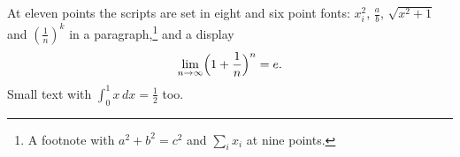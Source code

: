\documentclass[11pt]{article}
\begin{document}
At eleven points the scripts are set in eight and six point fonts: $x_i^2$, $\frac{a}{b}$, $\sqrt{x^2+1}$ and $\left(\frac{1}{n}\right)^{k}$ in a paragraph,\footnote{A footnote with $a^2+b^2=c^2$ and $\sum_i x_i$ at nine points.} and a display
\[ \lim_{n\to\infty} \Bigl(1+\frac{1}{n}\Bigr)^n = e. \]
{\small Small text with $\int_0^1 x\,dx = \tfrac12$ too.}
\end{document}
